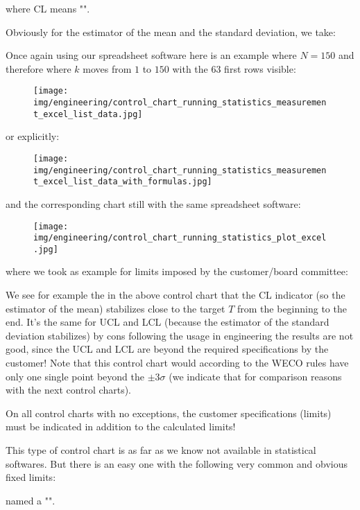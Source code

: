 	where CL means "".
	
	Obviously for the estimator of the mean and the standard deviation, we take:
	
	Once again using our spreadsheet software here is an example where $N=150$ and therefore where $k$ moves from $1$ to $150$ with the $63$ first rows visible:
	\begin{figure}[H]
		\centering
		\texttt{[image: img/engineering/control\_chart\_running\_statistics\_measurement\_excel\_list\_data.jpg]}
	\end{figure}
	or explicitly:
	\begin{figure}[H]
		\centering
		\texttt{[image: img/engineering/control\_chart\_running\_statistics\_measurement\_excel\_list\_data\_with\_formulas.jpg]}
	\end{figure}
	and the corresponding chart still with the same spreadsheet software:
	\begin{figure}[H]
		\centering
		\texttt{[image: img/engineering/control\_chart\_running\_statistics\_plot\_excel.jpg]}
	\end{figure}
	where we took as example for limits imposed by the customer/board committee:
	
	We see for example the in the above control chart that the CL indicator (so the estimator of the mean) stabilizes close to the target $T$ from the beginning to the end. It's the same for UCL and LCL (because the estimator of the standard deviation stabilizes) by cons following the usage in engineering the results are not good, since the UCL and LCL are beyond the required specifications by the customer! Note that this control chart would according to the WECO rules have only one single point beyond the $\pm 3\sigma$ (we indicate that for comparison reasons  with the next control charts).
	
	\begin{tcolorbox}[title=Remark,colframe=black,arc=10pt]
	On all control charts with no exceptions, the customer specifications (limits) must be indicated in addition to the calculated limits!
	\end{tcolorbox}
	
	This type of control chart is as far as we know not available in  statistical softwares. But there is an easy one with the following very common and obvious fixed limits:
	
	named a "".
	
